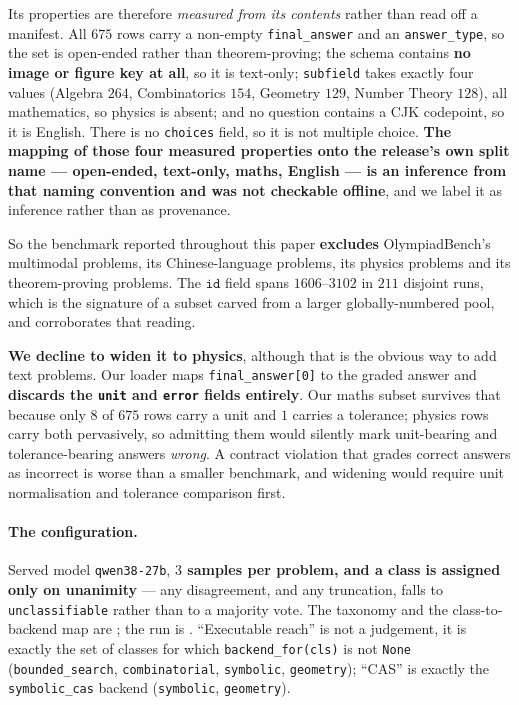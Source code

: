 Its properties are therefore \emph{measured from its contents} rather than read off a manifest.
All $675$ rows carry a non-empty \texttt{final\_answer} and an \texttt{answer\_type}, so the
set is open-ended rather than theorem-proving; the schema contains \textbf{no image or figure
key at all}, so it is text-only; \texttt{subfield} takes exactly four values (Algebra $264$,
Combinatorics $154$, Geometry $129$, Number Theory $128$), all mathematics, so physics is
absent; and no question contains a CJK codepoint, so it is English. There is no
\texttt{choices} field, so it is not multiple choice. \textbf{The mapping of those four
measured properties onto the release's own split name --- open-ended, text-only, maths, English
--- is an inference from that naming convention and was not checkable offline}, and we label it
as inference rather than as provenance.

So the benchmark reported throughout this paper \textbf{excludes} OlympiadBench's multimodal
problems, its Chinese-language problems, its physics problems and its theorem-proving problems.
The $\texttt{id}$ field spans $1606$--$3102$ in $211$ disjoint runs, which is the signature of a
subset carved from a larger globally-numbered pool, and corroborates that reading.

\textbf{We decline to widen it to physics}, although that is the obvious way to add text
problems. Our loader maps \texttt{final\_answer[0]} to the graded answer and \textbf{discards
the \texttt{unit} and \texttt{error} fields entirely}. Our maths subset survives that because
only $8$ of $675$ rows carry a unit and $1$ carries a tolerance; physics rows carry both
pervasively, so admitting them would silently mark unit-bearing and tolerance-bearing answers
\emph{wrong}. A contract violation that grades correct answers as incorrect is worse than a
smaller benchmark, and widening would require unit normalisation and tolerance comparison
first.

\begin{sloppypar}
\paragraph{The configuration.} Served model \texttt{qwen38-27b}, \textbf{$3$ samples per
problem, and a class is assigned only on unanimity} --- any disagreement, and any truncation,
falls to \texttt{unclassifiable} rather than to a majority vote. The taxonomy and the
class-to-backend map are ; the run is
. ``Executable reach'' is not a judgement, it is exactly
the set of classes for which \texttt{backend\_for(cls)} is not \texttt{None}
(\texttt{bounded\_search}, \texttt{combinatorial}, \texttt{symbolic}, \texttt{geometry});
``CAS'' is exactly the \texttt{symbolic\_cas} backend (\texttt{symbolic}, \texttt{geometry}).
\end{sloppypar}

